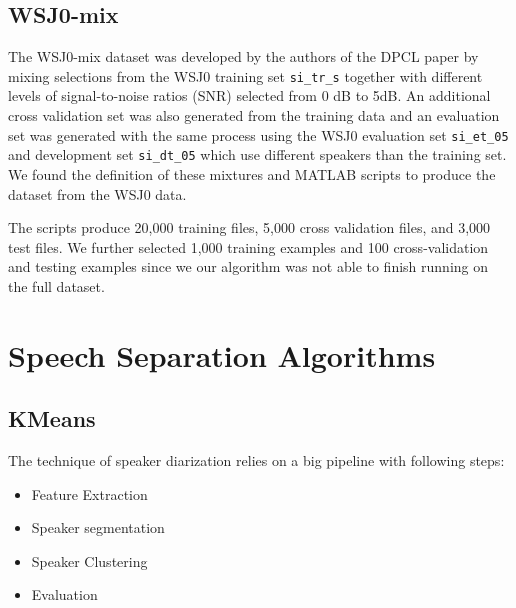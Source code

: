 \documentclass[journal, a4paper]{IEEEtran}
\begin{document}
\subsection{WSJ0-mix}
The WSJ0-mix dataset was developed by the authors of the DPCL \cite{DBLP:journals/corr/HersheyCRW15} paper by mixing selections from the WSJ0 training set \texttt{si\_tr\_s} together with different levels of signal-to-noise ratios (SNR) selected from 0 dB to 5dB. An additional cross validation set was also generated from the training data and an evaluation set was generated with the same process using the WSJ0 evaluation set \texttt{si\_et\_05} and development set \texttt{si\_dt\_05} which use different speakers than the training set. We found the definition of these mixtures and MATLAB scripts \cite{wsjmix} to produce the dataset from the WSJ0 data.

The scripts produce 20,000 training files, 5,000 cross validation files, and 3,000 test files. We further selected 1,000 training examples and 100 cross-validation and testing examples since we our algorithm was not able to finish running on the full dataset.

\section{Speech Separation Algorithms}
\subsection{KMeans}
The technique of speaker diarization relies on a big pipeline with following steps:
\begin{itemize}
    \item Feature Extraction
    \item Speaker segmentation
    \item Speaker Clustering
    \item Evaluation
\end{itemize}
\end{document}
